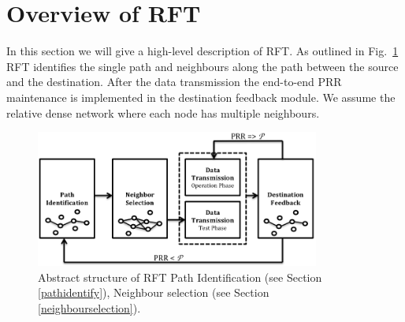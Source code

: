\documentclass[conference]{IEEEtran}
\begin{document}
\section{Overview of RFT}
\label{overview}
In this section we will give a high-level description of RFT. As outlined in Fig.~\ref{fig:Overview} RFT identifies the single path and neighbours along the path between the source and the destination. After the data transmission the end-to-end PRR maintenance is implemented in the destination feedback module. We assume the relative dense network where each node has multiple neighbours.
\begin{figure}
\centering
\includegraphics[height=4.5cm]{overview2.png}
\caption{Abstract structure of RFT Path Identification (see Section \ref{pathidentify}), Neighbour selection (see Section \ref{neighbourselection}).}
\label{fig:Overview}
\end{figure}
\end{document}
